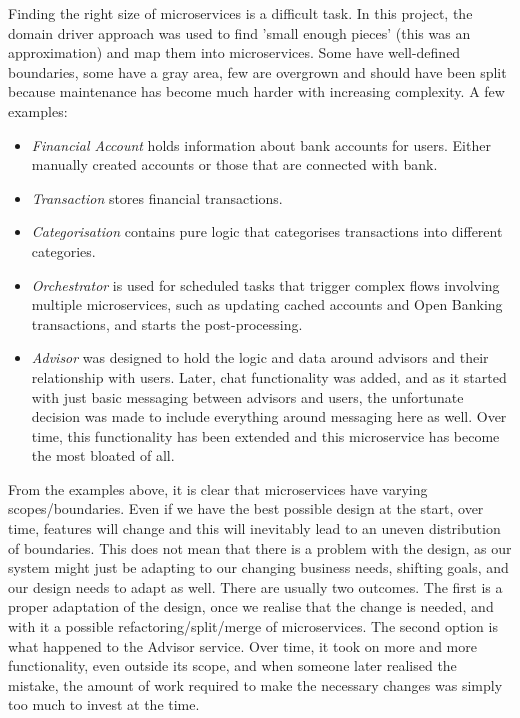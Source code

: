 Finding the right size of microservices is a difficult task. In this project, the domain driver approach was used to find 'small enough pieces' (this was an approximation) and map them into microservices. Some have well-defined boundaries, some have a gray area, few are overgrown and should have been split because maintenance has become much harder with increasing complexity. A few examples:

\begin{itemize}
    \item \textit{Financial Account} holds information about bank accounts for users. Either manually created accounts or those that are connected with bank.
    \item \textit{Transaction} stores financial transactions.
    \item \textit{Categorisation} contains pure logic that categorises transactions into different categories.
    \item \textit{Orchestrator} is used for scheduled tasks that trigger complex flows involving multiple microservices, such as updating cached accounts and Open Banking transactions, and starts the post-processing.
    \item \textit{Advisor} was designed to hold the logic and data around advisors and their relationship with users. Later, chat functionality was added, and as it started with just basic messaging between advisors and users, the unfortunate decision was made to include everything around messaging here as well. Over time, this functionality has been extended and this microservice has become the most bloated of all.
\end{itemize}

From the examples above, it is clear that microservices have varying scopes/boundaries. Even if we have the best possible design at the start, over time, features will change and this will inevitably lead to an uneven distribution of boundaries. This does not mean that there is a problem with the design, as our system might just be adapting to our changing business needs, shifting goals, and our design needs to adapt as well. There are usually two outcomes. The first is a proper adaptation of the design, once we realise that the change is needed, and with it a possible refactoring/split/merge of microservices. The second option is what happened to the Advisor service. Over time, it took on more and more functionality, even outside its scope, and when someone later realised the mistake, the amount of work required to make the necessary changes was simply too much to invest at the time.

